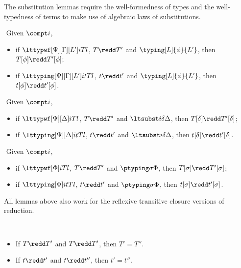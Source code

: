 The substitution lemmas require the well-formedness of types and the well-typedness of
terms to make use of algebraic laws of substitutions.
\begin{lemma} $ $
  Given $\compt i$,
  \begin{itemize}
  \item if $\lttypwf[\Psi][\Gamma][L'] i T l$, $T \redd T'$ and $\typing[L]{\phi}{L'}$, then $T[\phi] \redd T'[\phi]$;
  \item if $\lttyping[\Psi][\Gamma][L'] i t T l$, $t \redd t'$ and
    $\typing[L]{\phi}{L'}$, then $t[\phi] \redd t'[\phi]$.
  \end{itemize}
\end{lemma}

\begin{lemma} $ $
  Given $\compt i$,
  \begin{itemize}
  \item if $\lttypwf[\Psi][\Delta] i T l$, $T \redd T'$ and $\ltsubst i \delta \Delta$, then $T[\delta] \redd T'[\delta]$;
  \item if $\lttyping[\Psi][\Delta] i t T l$, $t \redd t'$ and
    $\ltsubst i \delta \Delta$, then $t[\delta] \redd t'[\delta]$.
  \end{itemize}
\end{lemma}

\begin{lemma} $ $
  Given $\compt i$,
  \begin{itemize}
  \item if $\lttypwf[\Phi] i T l$, $T \redd T'$ and $\ptyping \sigma \Phi$, then $T[\sigma] \redd T'[\sigma]$;
  \item if $\lttyping[\Phi] i t T l$, $t \redd t'$ and
    $\ptyping \sigma \Phi$, then $t[\sigma] \redd t'[\sigma]$.
  \end{itemize}
\end{lemma}

All lemmas above also work for the reflexive transitive closure versions of
reduction. 

\begin{lemma}[Determinacy] $ $
  \begin{itemize}
  \item If $T \redd T'$ and $T \redd T'$, then $T' = T''$. 
  \item If $t \redd t'$ and $t \redd t''$, then $t' = t''$. 
  \end{itemize}
\end{lemma}

